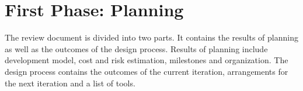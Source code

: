 \section{First Phase: Planning}
The review document is divided into two parts.
It contains the results of planning as well as the outcomes of the design process.
Results of planning include development model, cost and risk estimation, milestones and organization.
The design process contains the outcomes of the current iteration, arrangements for the next iteration and a list of tools.


